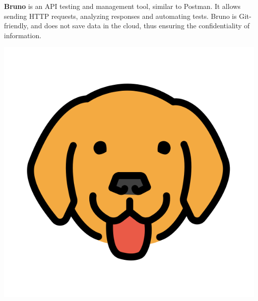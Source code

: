 \noindent%
\begin{minipage}{.7\textwidth}%
    \textbf{Bruno} is an API testing and management tool, similar to Postman. It allows sending HTTP requests, analyzing responses and automating tests. Bruno is Git-friendly, and does not save data in the cloud, thus ensuring the confidentiality of information.
\end{minipage}%
\hfill
\begin{minipage}{.22\textwidth}%
\includegraphics[width=\textwidth]{images/bruno.png}
\end{minipage} \\ \\ \\

